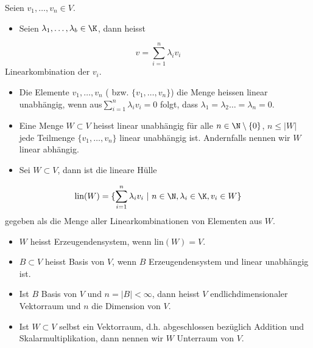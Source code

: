 \begin{definition}{}{}



Seien \(v_1,\ldots,v_n \in V\).
\begin{itemize}
\item {} 
Seien \(\lambda_1,\ldots,\lambda_b \in \K\), dann heisst

\end{itemize}
\begin{equation*}
 v = \sum_{i=1}^n \lambda_i v_i
\end{equation*}
Linearkombination der \(v_i\).
\begin{itemize}
\item {} 
Die Elemente \(v_1,\ldots,v_n\) ( bzw. \(\{v_1,\ldots,v_n\}\)) die Menge heissen linear unabhängig, wenn aus\(\sum_{i=1}^n \lambda_i v_i =0\) folgt, dass \(\lambda_1 = \lambda_2 \ldots = \lambda_n = 0\).

\item {} 
Eine Menge \(W \subset V\) heisst linear unabhängig für alle \(n \in \N \setminus \{0\}\), \(n \leq |W|\) jede Teilmenge \(\{v_1,\ldots,v_n\}\) linear unabhängig ist. Andernfalls nennen wir \(W\) linear abhängig.

\item {} 
Sei \(W \subset V\), dann ist die lineare Hülle

\end{itemize}
\begin{equation*}
 \text{lin}(W) = \{ \sum_{i=1}^n \lambda_i v_i~|~ n \in \N, \lambda_i \in \K, v_i \in W\}
\end{equation*}
gegeben als die Menge aller Linearkombinationen von Elementen aus \(W\).
\begin{itemize}
\item {} 
\(W\) heisst Erzeugendensystem, wenn lin\((W)=V\).

\item {} 
\(B \subset V\) heisst Basis von \(V\), wenn \(B\) Erzeugendensystem und linear unabhängig ist.

\item {} 
Ist \(B\) Basis von \(V\) und \(n=|B| < \infty\), dann heisst \(V\) endlichdimensionaler Vektorraum und \(n\) die Dimension von \(V\).

\item {} 
Ist \(W \subset V\) selbst ein Vektorraum, d.h. abgeschlossen bezüglich Addition und Skalarmultiplikation, dann nennen wir \(W\) Unterraum von \(V\).

\end{itemize}
\end{definition}

